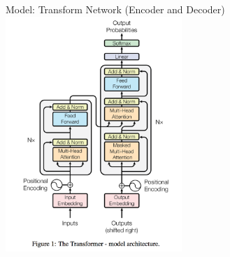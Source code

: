 \documentclass{beamer}
\begin{document}
\begin{frame}{Model: Transform Network (Encoder and Decoder)}{}
\centering
\includegraphics[width=0.5\textwidth]{img/transformer.png}
\end{frame}
%
\end{document}
